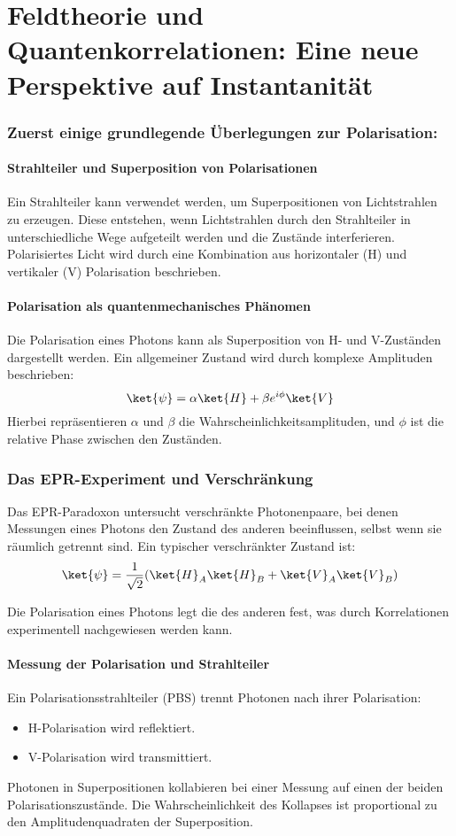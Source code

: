 \documentclass[12pt,a4paper]{article}
\begin{document}
	
	\part{Feldtheorie und Quantenkorrelationen: Eine neue Perspektive auf Instantanität }
	\section{ Zuerst einige grundlegende Überlegungen zur Polarisation:}
	\subsection{Strahlteiler und Superposition von Polarisationen}
	Ein Strahlteiler kann verwendet werden, um Superpositionen von Lichtstrahlen zu erzeugen. Diese entstehen, wenn Lichtstrahlen durch den Strahlteiler in unterschiedliche Wege aufgeteilt werden und die Zustände interferieren. Polarisiertes Licht wird durch eine Kombination aus horizontaler (H) und vertikaler (V) Polarisation beschrieben.
	
	\subsection{Polarisation als quantenmechanisches Phänomen}
	Die Polarisation eines Photons kann als Superposition von H- und V-Zuständen dargestellt werden. Ein allgemeiner Zustand wird durch komplexe Amplituden beschrieben:
	\[
	\ket{\psi} = \alpha \ket{H} + \beta e^{i\phi} \ket{V}
	\]
	Hierbei repräsentieren \(\alpha\) und \(\beta\) die Wahrscheinlichkeitsamplituden, und \(\phi\) ist die relative Phase zwischen den Zuständen.
	
	\section{Das EPR-Experiment und Verschränkung}
	Das EPR-Paradoxon untersucht verschränkte Photonenpaare, bei denen Messungen eines Photons den Zustand des anderen beeinflussen, selbst wenn sie räumlich getrennt sind. Ein typischer verschränkter Zustand ist:
	\[
	\ket{\psi} = \frac{1}{\sqrt{2}} (\ket{H}_A \ket{H}_B + \ket{V}_A \ket{V}_B)
	\]
	
	
	Die Polarisation eines Photons legt die des anderen fest, was durch Korrelationen experimentell nachgewiesen werden kann.
	
	\subsection{Messung der Polarisation und Strahlteiler}
	Ein Polarisationsstrahlteiler (PBS) trennt Photonen nach ihrer Polarisation:
	\begin{itemize}
		\item H-Polarisation wird reflektiert.
		\item V-Polarisation wird transmittiert.
	\end{itemize}
	Photonen in Superpositionen kollabieren bei einer Messung auf einen der beiden Polarisationszustände. Die Wahrscheinlichkeit des Kollapses ist proportional zu den Amplitudenquadraten der Superposition.
	
\end{document}
